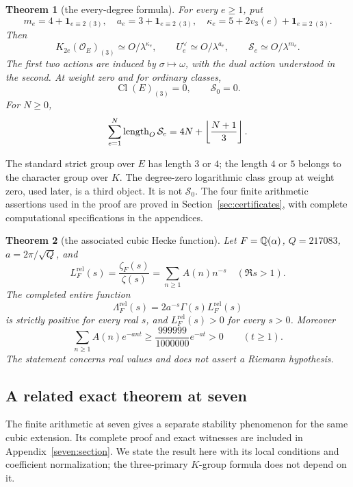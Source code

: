 \documentclass[11pt]{article}
\newtheorem{theorem}{Theorem}[section]
\theoremstyle{remark}\newtheorem{remark}[theorem]{Remark}
\newcommand{\Oa}{\mathcal O}\newcommand{\Cl}{\operatorname{Cl}}
\newcommand{\ind}{\mathbf1}
\begin{document}
\begin{theorem}[the every-degree formula]
\label{thm:main}
For every $e\geq1$, put
\[
 m_e=4+\ind_{e\equiv2\ (3)},\quad a_e=3+\ind_{e\equiv2\ (3)},\quad
 \kappa_e=5+2v_3(e)+\ind_{e\equiv2\ (3)}.
\]
Then
\[
 K_{2e}(\Oa_E)_{(3)}\simeq O/\lambda^{\kappa_e},\qquad
 U_e^\vee\simeq O/\lambda^{a_e},\qquad
 \mathcal S_e\simeq O/\lambda^{m_e}.
\]
The first two actions are induced by $\sigma\mapsto\omega$, with the dual action understood in the second.
At weight zero and for ordinary classes,
\[
 \Cl(E)_{(3)}=0,\qquad\mathcal S_0=0.
\]
For $N\geq0$,
\[
 \sum_{e=1}^N\operatorname{length}_O\mathcal S_e
 =4N+\left\lfloor\frac{N+1}{3}\right\rfloor.
\]
\end{theorem}
The standard strict group over $E$ has length $3$ or $4$; the length $4$ or $5$ belongs to the character group over $K$.
The degree-zero logarithmic class group at weight zero, used later, is a third object. It is not $\mathcal S_0$.
The four finite arithmetic assertions used in the proof are proved in Section~\ref{sec:certificates}, with complete computational specifications in the appendices.

\begin{theorem}[the associated cubic Hecke function]
\label{thm:cubic-real-positive}
Let $F=\mathbb Q(\alpha)$, $Q=217083$, $a=2\pi/\sqrt Q$, and
\[
 L_F^{\mathrm{rel}}(s)=\frac{\zeta_F(s)}{\zeta(s)}
   =\sum_{n\ge1}A(n)n^{-s}\quad(\Re s>1).
\]
The completed entire function
\[
 \Lambda_F^{\mathrm{rel}}(s)=2a^{-s}\Gamma(s)L_F^{\mathrm{rel}}(s)
\]
is strictly positive for every real $s$, and $L_F^{\mathrm{rel}}(s)>0$ for every $s>0$.
Moreover
\[
 \sum_{n\ge1}A(n)e^{-ant}
       \ge\frac{999999}{1000000}e^{-at}>0\qquad(t\ge1).
\]
The statement concerns real values and does not assert a Riemann hypothesis.
\end{theorem}

\subsection{A related exact theorem at seven}

The finite arithmetic at seven gives a separate stability phenomenon for
the same cubic extension. Its complete proof and exact witnesses are
included in Appendix~\ref{seven:section}.
We state the result here with its local conditions and coefficient
normalization; the three-primary $K$-group formula does not depend on it.
\end{document}
